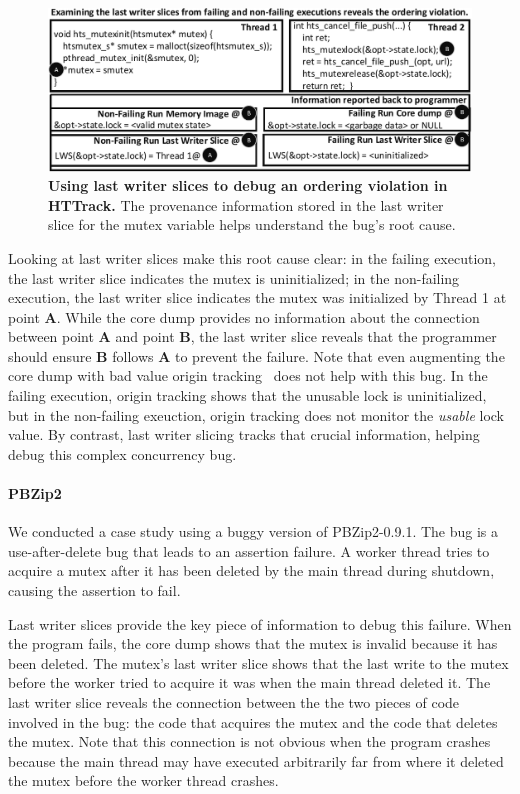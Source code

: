 \documentclass[preprint,9pt]{sigplanconf}
\begin{document}
\begin{figure}[h]
\centering
\includegraphics[width=\columnwidth]{figs/LWSHTTDebug.pdf}
\caption{\label{fig:httlws}{\bf Using last writer slices to debug an
ordering violation in HTTrack.} The provenance information stored in the last
writer slice for the mutex variable helps understand the bug's root cause.}
\end{figure}


Looking at last writer slices make this root cause clear: in the failing
execution, the last writer slice indicates the mutex is uninitialized; in the
non-failing execution, the last writer slice indicates the mutex was
initialized by Thread 1 at point {\bf A}. While the core dump provides no
information about the connection between point {\bf A} and point {\bf B}, the
last writer slice reveals that the programmer should ensure {\bf B} follows
{\bf A} to prevent the failure.  Note that even augmenting the core dump with
bad value origin tracking~\cite{badapples} does not help with this bug.  In the
failing execution, origin tracking shows that the unusable lock is
uninitialized, but in the non-failing exeuction, origin tracking does not
monitor the {\em usable} lock value.  By contrast, last writer slicing tracks
that crucial information, helping debug this complex concurrency bug. 





\paragraph{PBZip2}
We conducted a case study using a buggy version of PBZip2-0.9.1.    The bug is
a use-after-delete bug that leads to an assertion failure.  A worker thread
tries to acquire a mutex after it has been deleted by the main thread during
shutdown, causing the assertion to fail.  

Last writer slices provide the key piece of information to debug this failure.
When the program fails, the core dump shows that the mutex is invalid because
it has been deleted.  The mutex's last writer slice shows that the last write
to the mutex before the worker tried to acquire it was when the main thread
deleted it.  The last writer slice reveals the connection between the the two
pieces of code involved in the bug: the code that acquires the mutex and the
code that deletes the mutex.  Note that this connection is not obvious when the
program crashes because the main thread may have executed arbitrarily far from
where it deleted the mutex before the worker thread crashes.  
\end{document}
